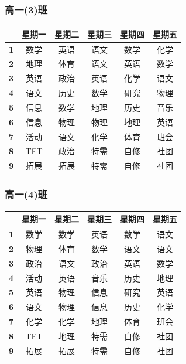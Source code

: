 \documentclass[a4paper]{article}
\begin{document}
  \subsubsection{高一(3)班}
   \begin{tabular}{|c|c|c|c|c|c|}
   \hline
   & \bf 星期一 & \bf 星期二 & \bf 星期三 & \bf 星期四 & \bf 星期五 \\\hline
   \bf 1 & 数学 & 英语 & 语文 & 数学 & 化学 \\\hline
   \bf 2 & 地理 & 体育 & 语文 & 英语 & 数学 \\\hline
   \bf 3 & 英语 & 政治 & 英语 & 化学 & 语文 \\\hline
   \bf 4 & 语文 & 历史 & 数学 & 研究 & 物理 \\\hline
   \bf 5 & 信息 & 数学 & 地理 & 历史 & 音乐 \\\hline
   \bf 6 & 信息 & 物理 & 物理 & 地理 & 英语 \\\hline
   \bf 7 & 活动 & 语文 & 化学 & 体育 & 班会 \\\hline
   \bf 8 & TFT  & 政治 & 特需 & 自修 & 社团 \\\hline
   \bf 9 & 拓展 & 拓展 & 特需 & 自修 & 社团 \\\hline
   \end{tabular}
  \subsubsection{高一(4)班}
   \begin{tabular}{|c|c|c|c|c|c|}
   \hline
   & \bf 星期一 & \bf 星期二 & \bf 星期三 & \bf 星期四 & \bf 星期五 \\\hline
   \bf 1 & 数学 & 数学 & 英语 & 数学 & 语文 \\\hline
   \bf 2 & 物理 & 体育 & 数学 & 语文 & 语文 \\\hline
   \bf 3 & 政治 & 语文 & 政治 & 英语 & 数学 \\\hline
   \bf 4 & 活动 & 英语 & 音乐 & 历史 & 地理 \\\hline
   \bf 5 & 英语 & 物理 & 信息 & 研究 & 英语 \\\hline
   \bf 6 & 语文 & 物理 & 信息 & 历史 & 化学 \\\hline
   \bf 7 & 化学 & 化学 & 地理 & 体育 & 班会 \\\hline
   \bf 8 & TFT  & 地理 & 特需 & 自修 & 社团 \\\hline
   \bf 9 & 拓展 & 拓展 & 特需 & 自修 & 社团 \\\hline
   \end{tabular}
\end{document}
